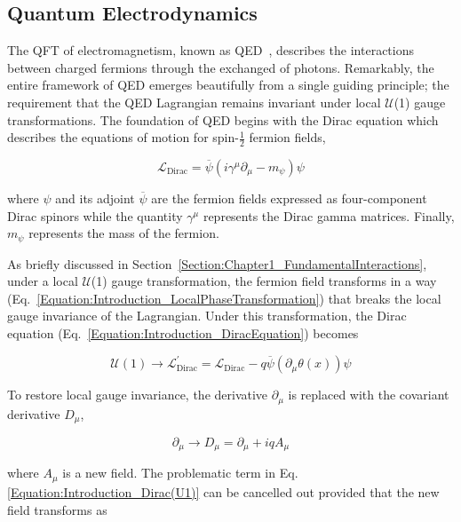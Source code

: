 \subsection{Quantum Electrodynamics}

The QFT of electromagnetism, known as \ac{QED}~\cite{QED}, describes the interactions between charged fermions through the exchanged of photons. Remarkably, the entire framework of QED emerges beautifully from a single guiding principle; the requirement that the QED Lagrangian remains invariant under local $\mathcal{U}$(1) gauge transformations. The foundation of QED begins with the Dirac equation \cite{MarkThompson} which describes the equations of motion for spin-$\frac{1}{2}$ fermion fields,

\begin{equation}
    \mathcal{L}_{\text{Dirac}} = \overline{\psi}(i\gamma^\mu \partial_\mu - m_{\psi}) \psi
\label{Equation:Introduction_DiracEquation}
\end{equation}

where $\psi$ and its adjoint $\overline{\psi}$ are the fermion fields expressed as four-component Dirac spinors while the quantity $\gamma^\mu$ represents the Dirac gamma matrices. Finally, $m_{\psi}$ represents the mass of the fermion.

As briefly discussed in Section~\ref{Section:Chapter1_FundamentalInteractions}, under a local $\mathcal{U}$(1) gauge transformation, the fermion field transforms in a way (Eq.~\ref{Equation:Introduction_LocalPhaseTransformation}) that breaks the local gauge invariance of the Lagrangian. Under this transformation, the Dirac equation (Eq.~\ref{Equation:Introduction_DiracEquation}) becomes

\begin{equation}
    \mathcal{U}(1) \rightarrow \mathcal{L}_{\text{Dirac}}^{\prime} = \mathcal{L}_{\text{Dirac}} - q\overline{\psi}(\partial_\mu\theta(x))\psi
\label{Equation:Introduction_Dirac(U1)}
\end{equation}

To restore local gauge invariance, the derivative $\partial_\mu$ is replaced with the covariant derivative $D_\mu$,

\begin{equation}
    \partial_\mu \rightarrow D_\mu = \partial_\mu + iqA_\mu
\end{equation}

where $A_\mu$ is a new field. The problematic term in Eq.\ref{Equation:Introduction_Dirac(U1)} can be cancelled out provided that the new field transforms as

